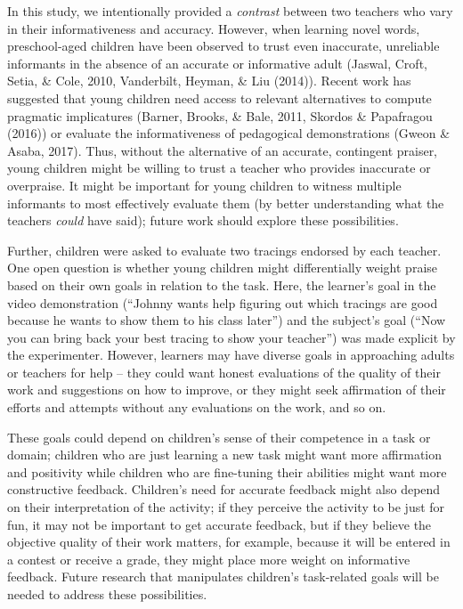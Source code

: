 \documentclass[10pt, letterpaper]{article}
\begin{document}
In this study, we intentionally provided a \textit{contrast} between two
teachers who vary in their informativeness and accuracy. However, when
learning novel words, preschool-aged children have been observed to
trust even inaccurate, unreliable informants in the absence of an
accurate or informative adult (Jaswal, Croft, Setia, \& Cole, 2010,
Vanderbilt, Heyman, \& Liu (2014)). Recent work has suggested that young
children need access to relevant alternatives to compute pragmatic
implicatures (Barner, Brooks, \& Bale, 2011, Skordos \& Papafragou
(2016)) or evaluate the informativeness of pedagogical demonstrations
(Gweon \& Asaba, 2017). Thus, without the alternative of an accurate,
contingent praiser, young children might be willing to trust a teacher
who provides inaccurate or overpraise. It might be important for young
children to witness multiple informants to most effectively evaluate
them (by better understanding what the teachers \textit{could} have
said); future work should explore these possibilities.

Further, children were asked to evaluate two tracings endorsed by each
teacher. One open question is whether young children might
differentially weight praise based on their own goals in relation to the
task. Here, the learner's goal in the video demonstration (``Johnny
wants help figuring out which tracings are good because he wants to show
them to his class later'') and the subject's goal (``Now you can bring
back your best tracing to show your teacher'') was made explicit by the
experimenter. However, learners may have diverse goals in approaching
adults or teachers for help -- they could want honest evaluations of the
quality of their work and suggestions on how to improve, or they might
seek affirmation of their efforts and attempts without any evaluations
on the work, and so on.

These goals could depend on children's sense of their competence in a
task or domain; children who are just learning a new task might want
more affirmation and positivity while children who are fine-tuning their
abilities might want more constructive feedback. Children's need for
accurate feedback might also depend on their interpretation of the
activity; if they perceive the activity to be just for fun, it may not
be important to get accurate feedback, but if they believe the objective
quality of their work matters, for example, because it will be entered
in a contest or receive a grade, they might place more weight on
informative feedback. Future research that manipulates children's
task-related goals will be needed to address these possibilities.
\end{document}
